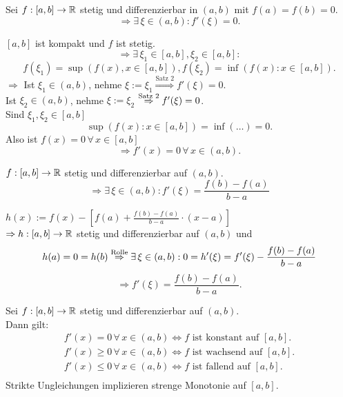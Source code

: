 \documentclass[../ana1.tex]{subfiles}
\begin{document}
\begin{satz}[Rolle]
    Sei \( f: [a,b] \rightarrow \mathbb{R} \) stetig und differenzierbar 
    in \( (a,b) \) mit \( f(a) = f(b) = 0 \).
    \[ \Rightarrow \exists \, \xi \in (a,b) : f'(\xi) = 0. \]
\end{satz}
\begin{bew}
    \( [a,b]\) ist kompakt und \(f\) ist stetig.
    \[ \Rightarrow \exists \, \xi_1 \in [a,b], \xi_2 \in [a,b]: \]
    \[ f(\xi_1) = \sup( f(x), x \in [a,b] ), f(\xi_2) 
    = \inf (f(x) : x \in [a,b]). \]
    \( \Rightarrow \) Ist \( \xi_1 \in (a,b) \), nehme 
    \( \xi := \xi_1 \overset{\text{Satz 2}}{\Rightarrow}
     f'(\xi) = 0 \).\\
    Ist \( \xi_2 \in (a,b) \), nehme \( \xi := \xi_2 \)
    \( \overset{\text{Satz 2}}{\Rightarrow} f'(\xi) = 0 \).\\
    Sind \( \xi_1, \xi_2 \in [a,b] \)
    \[ \sup(f(x) : x\in [a,b]) = \inf(\ldots) = 0. \]
    Also ist \( f(x) = 0 \,\forall \, x\in [a,b] \)
    \[ \Rightarrow f'(x) = 0 \, \forall \, x\in (a,b). \]
\end{bew}
\begin{satz}[Mittelwertsatz]\label{satz:mittlewert}
    \( f: [a, b] \rightarrow \mathbb{R} \) stetig und differenzierbar 
    auf \((a,b)\).
    \[ \Rightarrow \exists \, \xi \in (a,b): f'(\xi) = \frac{f(b)-f(a)}{b-a} \]
\end{satz}
\begin{bew}
    \( h(x) :=  f(x) - \left[f(a) + \frac{f(b)-f(a)}{b-a} 
    \cdot (x-a) \right] \) \\
    \( \Rightarrow h: [a,b] \rightarrow \mathbb{R} \) stetig und 
    differenzierbar auf \( (a,b) \) und 
    \[ h(a) = 0 = h(b) \overset{\text{Rolle}}{\Rightarrow} 
    \exists \, \xi \in (a,b): 0 = h'(\xi) = f'(\xi) 
    - \frac{f(b)-f(a)}{b-a} \]
    \[ \Rightarrow f'(\xi) = \frac{f(b)-f(a)}{b-a}. \]
\end{bew}
\begin{kor}[Monotoniekriterium]\label{satz:monotoniekrit}
    Sei \( f : [a,b] \rightarrow \mathbb{R} \) stetig und differenzierbar 
    auf \( (a,b) \).\\
    Dann gilt:
    \begin{align*}
        f'(x) = 0 \,\forall \, x \in (a,b) \Leftrightarrow 
        f \text{ ist konstant auf } [a,b].\\
        f'(x) \geq 0 \,\forall \, x \in (a,b) \Leftrightarrow 
        f \text{ ist wachsend auf } [a,b].\\ 
        f'(x) \leq 0 \,\forall \, x \in (a,b) \Leftrightarrow 
        f \text{ ist fallend auf } [a,b].\\
    \end{align*}
    Strikte Ungleichungen implizieren strenge Monotonie auf 
    \( [a,b] \).
\end{kor}
\end{document}

